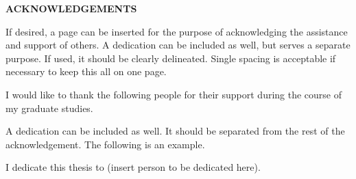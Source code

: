 \begin{center}
    \textbf{ACKNOWLEDGEMENTS}
\end{center}
\doublespacing
\par If desired, a page can be inserted for the purpose of acknowledging the assistance and support of others. A dedication can be included as well, but serves a separate purpose. If used, it should be clearly delineated. Single spacing is acceptable if necessary to keep this all on one page.\par

I would like to thank the following people for their support during the course of my graduate studies.\par

A dedication can be included as well. It should be separated from the rest of the acknowledgement. The following is an example.\par

I dedicate this thesis to (insert person to be dedicated here).
